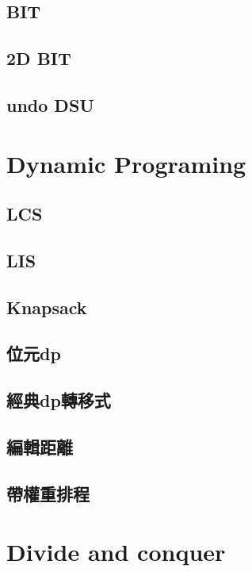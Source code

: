 \subsection{BIT}

\subsection{2D BIT}

\subsection{undo DSU}


\section{Dynamic Programing}
\subsection{LCS}

\subsection{LIS}

\subsection{Knapsack}

\subsection{位元dp}

\subsection{經典dp轉移式}

\subsection{編輯距離}

\subsection{帶權重排程}


\section{Divide and conquer}
